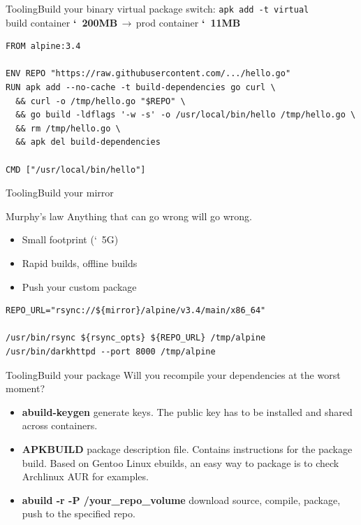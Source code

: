 \documentclass{beamer}
\begin{document}
\begin{frame}[fragile]{Tooling}{Build your binary}
  virtual package switch:  \texttt{apk add -t virtual} \\
  build container \textbf{\char`~200MB}$\,\to\,$prod container
  \textbf{\char`~11MB}

  \begin{verbatim}
FROM alpine:3.4

ENV REPO "https://raw.githubusercontent.com/.../hello.go"
RUN apk add --no-cache -t build-dependencies go curl \
  && curl -o /tmp/hello.go "$REPO" \
  && go build -ldflags '-w -s' -o /usr/local/bin/hello /tmp/hello.go \
  && rm /tmp/hello.go \
  && apk del build-dependencies

CMD ["/usr/local/bin/hello"]
  \end{verbatim}
\end{frame}

\begin{frame}[fragile]{Tooling}{Build your mirror}

  \begin{block}{Murphy's law}
    Anything that can go wrong will go wrong.
  \end{block}

    \begin{itemize}
      \item Small footprint (\char`~5G)
      \item Rapid builds, offline builds
      \item Push your custom package
  \end{itemize}

  \begin{verbatim}
REPO_URL="rsync://${mirror}/alpine/v3.4/main/x86_64"

/usr/bin/rsync ${rsync_opts} ${REPO_URL} /tmp/alpine
/usr/bin/darkhttpd --port 8000 /tmp/alpine
  \end{verbatim}
\end{frame}

\begin{frame}[fragile]{Tooling}{Build your package}
  Will you recompile your dependencies at the worst moment?
  \\
  \begin{itemize}
    \item \textbf{abuild-keygen} generate keys. The public key has to be
      installed and shared across containers.
    \item \textbf{APKBUILD} package description file. Contains instructions for
      the package build. Based on Gentoo Linux ebuilds, an easy way to package
      is to check Archlinux AUR for examples.
    \item \textbf{abuild -r -P /your\_repo\_volume} download source, compile,
      package, push to the specified repo.
  \end{itemize}
\end{frame}
\end{document}
